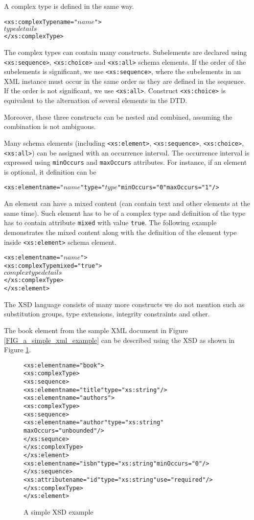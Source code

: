 A complex type is defined in the same way.
\begin{alltt}
<xs:complexType name="\(name\)">
  \(type details\)
</xs:complexType>
\end{alltt}
The complex types can contain many constructs. Subelements are declared using \texttt{<xs:sequence>}, \texttt{<xs:choice>} and \texttt{<xs:all>} schema elements. If the order of the subelements is significant, we use \texttt{<xs:sequence>}, where the subelements in an XML instance must occur in the same order as they are defined in the sequence. If the order is not significant, we use \texttt{<xs:all>}. Construct \texttt{<xs:choice>} is equivalent to the alternation of several elements in the DTD.

Moreover, these three constructs can be nested and combined, assuming the combination is not ambiguous.

Many schema elements (including \texttt{<xs:element>}, \texttt{<xs:sequence>}, \texttt{<xs:choice>}, \texttt{<xs:all>}) can be assigned with an occurrence interval. The occurrence interval is expressed using \texttt{minOccurs} and \texttt{maxOccurs} attributes. For instance, if an element is optional, it definition can be
\begin{alltt}
<xs:element name="\(name\)" type="\(type\)" minOccurs="0" maxOccurs="1"/>
\end{alltt}

An element can have a mixed content (can contain text and other elements at the same time). Such element has to be of a complex type and definition of the type has to contain attribute \texttt{mixed} with value \texttt{true}. The following example demonstrates the mixed content along with the definition of the element type inside \texttt{<xs:element>} schema element.
\begin{alltt}
<xs:element name="\(name\)">
  <xs:complexType mixed="true">
    \(complex type details\)
  </xs:complexType>
</xs:element>
\end{alltt}

The XSD language consists of many more constructs we do not mention such as substitution groups, type extensions, integrity constraints and other.

The book element from the sample XML document in Figure \ref{FIG_a_simple_xml_example} can be described using the XSD as shown in Figure \ref{FIG_a_simple_xsd_example}.

\begin{figure}
\begin{alltt}
<xs:element name="book">
  <xs:complexType>
    <xs:sequence>
      <xs:element name="title" type="xs:string"/>
      <xs:element name="authors">
        <xs:complexType>
          <xs:sequence>
            <xs:element name="author" type="xs:string"
             maxOccurs="unbounded"/>
          </xs:sequnce>
        </xs:complexType>
      </xs:element>
      <xs:element name="isbn" type="xs:string" minOccurs="0"/>
    </xs:sequence>
    <xs:attribute name="id" type="xs:string" use="required"/>
  </xs:complexType>
</xs:element>
\end{alltt}
\caption{A simple XSD example}
\label{FIG_a_simple_xsd_example}
\end{figure}

